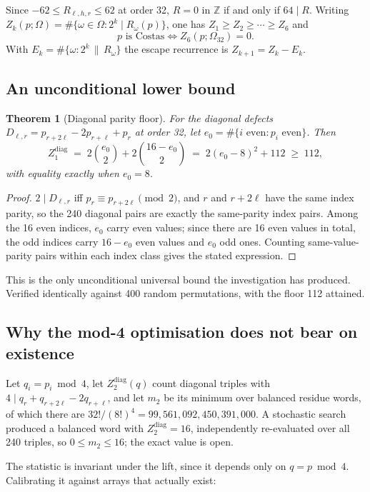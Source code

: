 \documentclass[11pt,a4paper]{article}
\newtheorem{theorem}{Theorem}[section]
\theoremstyle{definition}
\newcommand{\Z}{\mathbb{Z}}
\begin{document}
Since $-62\le R_{\ell,h,r}\le62$ at order 32, $R=0$ in $\Z$ if and only if
$64\mid R$. Writing $Z_k(p;\Omega)=\#\{\omega\in\Omega : 2^k\mid R_\omega(p)\}$,
one has $Z_1\ge Z_2\ge\cdots\ge Z_6$ and
\[
p \text{ is Costas} \iff Z_6(p;\Omega_{32})=0 .
\]
With $E_k=\#\{\omega : 2^k\,\|\,R_\omega\}$ the escape recurrence is
$Z_{k+1}=Z_k-E_k$.

\subsection{An unconditional lower bound}

\begin{theorem}[Diagonal parity floor]
\label{thm:parityfloor}
For the diagonal defects $D_{\ell,r}=p_{r+2\ell}-2p_{r+\ell}+p_r$ at order 32,
let $e_0=\#\{i \text{ even}: p_i \text{ even}\}$. Then
\[
Z_1^{\mathrm{diag}} \;=\; 2\binom{e_0}{2}+2\binom{16-e_0}{2}
\;=\; 2(e_0-8)^2+112 \;\ge\; 112,
\]
with equality exactly when $e_0=8$.
\end{theorem}
\begin{proof}
$2\mid D_{\ell,r}$ iff $p_r\equiv p_{r+2\ell}\pmod2$, and $r$ and $r+2\ell$ have
the same index parity, so the 240 diagonal pairs are exactly the same-parity
index pairs. Among the 16 even indices, $e_0$ carry even values; since there are
16 even values in total, the odd indices carry $16-e_0$ even values and $e_0$ odd
ones. Counting same-value-parity pairs within each index class gives the stated
expression.
\end{proof}

This is the only unconditional universal bound the investigation has produced.
Verified identically against 400 random permutations, with the floor 112
attained.

\subsection{Why the mod-4 optimisation does not bear on existence}

Let $q_i=p_i\bmod4$, let $Z_2^{\mathrm{diag}}(q)$ count diagonal triples with
$4\mid q_r+q_{r+2\ell}-2q_{r+\ell}$, and let $m_2$ be its minimum over balanced
residue words, of which there are $32!/(8!)^4 = 99{,}561{,}092{,}450{,}391{,}000$.
A stochastic search produced a balanced word with $Z_2^{\mathrm{diag}}=16$,
independently re-evaluated over all 240 triples, so $0\le m_2\le16$; the exact
value is open.

The statistic is invariant under the lift, since it depends only on
$q=p\bmod 4$. Calibrating it against arrays that actually exist:
\end{document}
